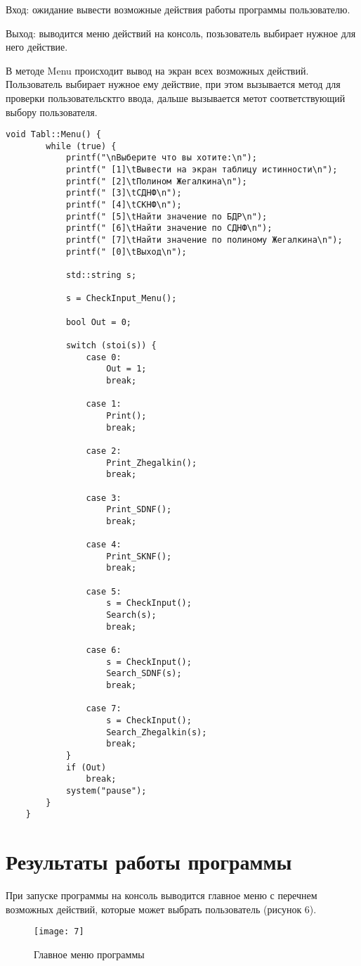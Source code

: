 \documentclass[10pt,a4paper,final]{article} %
\begin{document}
\par Вход: ожидание вывести возможные действия работы программы пользователю.
\par Выход: выводится меню действий на консоль, позьзователь выбирает нужное для него действие.
\par В методе  Menu происходит вывод на экран всех возможных действий. Пользователь выбирает  нужное ему действие, при этом вызывается метод для проверки пользовательсктго ввода, дальше вызывается метот соответствующий выбору пользователя.
\begin{lstlisting}[caption={Метод Menu}]
	void Tabl::Menu() {
		while (true) {
			printf("\nВыберите что вы хотите:\n");
			printf(" [1]\tВывести на экран таблицу истинности\n");
			printf(" [2]\tПолином Жегалкина\n");
			printf(" [3]\tСДНФ\n");
			printf(" [4]\tСКНФ\n");
			printf(" [5]\tНайти значение по БДР\n");
			printf(" [6]\tНайти значение по СДНФ\n");
			printf(" [7]\tНайти значение по полиному Жегалкина\n");
			printf(" [0]\tВыход\n");
			
			std::string s;
			
			s = CheckInput_Menu();
			
			bool Out = 0;
			
			switch (stoi(s)) {
				case 0:
					Out = 1;
					break;
					
				case 1:
					Print();
					break;
					
				case 2:
					Print_Zhegalkin();
					break;
			
				case 3:
					Print_SDNF();
					break;
			
				case 4:
					Print_SKNF();
					break;
			
				case 5:
					s = CheckInput();
					Search(s);
					break;
			
				case 6:
					s = CheckInput();
					Search_SDNF(s);
					break;
			
				case 7:
					s = CheckInput();
					Search_Zhegalkin(s);
					break;
			}
			if (Out)
				break;
			system("pause");
		}
	}
\end{lstlisting}

\newpage
\section{Результаты работы программы}

При запуске программы на консоль выводится главное меню с перечнем возможных действий, которые может выбрать пользователь (рисунок 6).
	\begin{figure}[h!]
	\centering
	\texttt{[image: 7]}
	\caption{Главное меню программы}
\end{figure}
\end{document}
